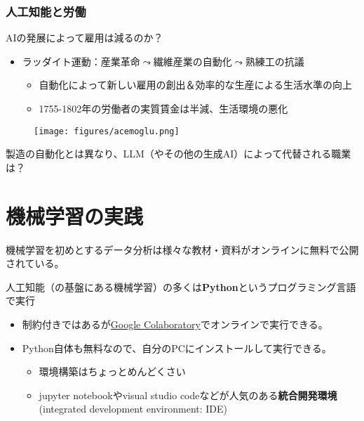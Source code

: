 \documentclass[
  xelatex,
  ja=standard]{bxjsarticle}
\providecommand{\tightlist}{%
  \setlength{\itemsep}{0pt}\setlength{\parskip}{0pt}}\usepackage{longtable,booktabs,array}
\begin{document}
\hypertarget{ux4ebaux5de5ux77e5ux80fdux3068ux52b4ux50cd}{%
\subsubsection{人工知能と労働}\label{ux4ebaux5de5ux77e5ux80fdux3068ux52b4ux50cd}}

AIの発展によって雇用は減るのか？

\begin{itemize}
\tightlist
\item
  ラッダイト運動：産業革命\(\leadsto\)繊維産業の自動化\(\leadsto\)熟練工の抗議

  \begin{itemize}
  \tightlist
  \item
    自動化によって新しい雇用の創出＆効率的な生産による生活水準の向上
  \item
    1755-1802年の労働者の実質賃金は半減、生活環境の悪化
  \end{itemize}
\end{itemize}

\begin{figure}[htpb]

{\centering \texttt{[image: figures/acemoglu.png]}

}

\caption{\citet{acemoglu2020}}

\end{figure}

製造の自動化とは異なり、LLM（やその他の生成AI）によって代替される職業は？\citep{eloundou2023}

\hypertarget{ux6a5fux68b0ux5b66ux7fd2ux306eux5b9fux8df5}{%
\section{機械学習の実践}\label{ux6a5fux68b0ux5b66ux7fd2ux306eux5b9fux8df5}}

機械学習を初めとするデータ分析は様々な教材・資料がオンラインに無料で公開されている。

人工知能（の基盤にある機械学習）の多くは\textbf{Python}というプログラミング言語で実行

\begin{itemize}
\tightlist
\item
  制約付きではあるが\href{https://colab.research.google.com/}{Google
  Colaboratory}でオンラインで実行できる。
\item
  Python自体も無料なので、自分のPCにインストールして実行できる。

  \begin{itemize}
  \tightlist
  \item
    環境構築はちょっとめんどくさい
  \item
    jupyter notebookやvisual studio
    codeなどが人気のある\textbf{統合開発環境} (integrated development
    environment: IDE)
  \end{itemize}
\end{itemize}
\end{document}
